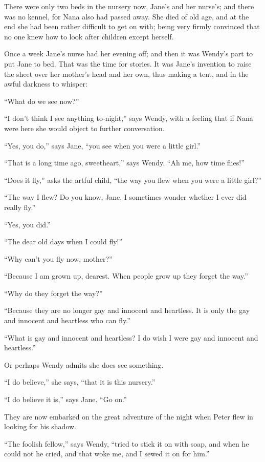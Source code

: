 There were only two beds in the nursery now, Jane’s and her nurse’s;
and there was no kennel, for Nana also had passed away.
She died of old age, and at the end she had been rather difficult to get on with;
being very firmly convinced that no one knew how to look after children except herself.

Once a week Jane’s nurse had her evening off;
and then it was Wendy’s part to put Jane to bed.
That was the time for stories.
It was Jane’s invention to raise the sheet over her mother’s head and her own, thus making a tent,
and in the awful darkness to whisper:

“What do we see now?”

“I don’t think I see anything to‐night,” says Wendy,
with a feeling that if Nana were here she would object to further conversation.

“Yes, you do,” says Jane, “you see when you were a little girl.”

“That is a long time ago, sweetheart,” says Wendy.
“Ah me, how time flies!”

“Does it fly,” asks the artful child, “the way you flew when you were a little girl?”

“The way I flew?
Do you know, Jane, I sometimes wonder whether I ever did really fly.”

“Yes, you did.”

“The dear old days when I could fly!”

“Why can’t you fly now, mother?”

“Because I am grown up, dearest.
When people grow up they forget the way.”

“Why do they forget the way?”

“Because they are no longer gay and innocent and heartless.
It is only the gay and innocent and heartless who can fly.”

“What is gay and innocent and heartless?
I do wish I were gay and innocent and heartless.”

Or perhaps Wendy admits she does see something.

“I do believe,” she says, “that it is this nursery.”

“I do believe it is,” says Jane.
“Go on.”

They are now embarked on the great adventure of the night when Peter flew in looking for his shadow.

“The foolish fellow,” says Wendy, “tried to stick it on with soap,
and when he could not he cried, and that woke me, and I sewed it on for him.”

